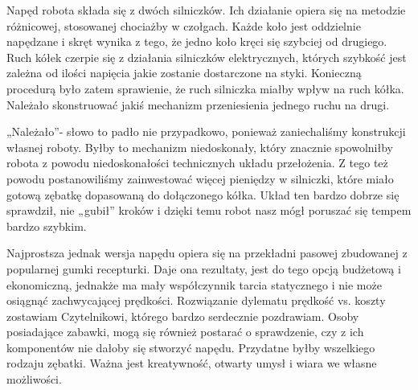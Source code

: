 Napęd robota składa się z dwóch silniczków. Ich działanie opiera się na metodzie różnicowej, stosowanej chociażby w czołgach. Każde koło jest oddzielnie napędzane i skręt wynika z tego, że jedno koło kręci się szybciej od drugiego. Ruch kółek czerpie się z działania silniczków elektrycznych, których szybkość jest zależna od ilości napięcia jakie zostanie dostarczone na styki. Konieczną procedurą było zatem sprawienie, że ruch silniczka miałby wpływ na ruch kółka. Należało skonstruować jakiś mechanizm przeniesienia jednego ruchu na drugi. 

„Należało”- słowo to padło nie przypadkowo, ponieważ zaniechaliśmy konstrukcji własnej roboty. Byłby to mechanizm niedoskonały, który znacznie spowolniłby robota z powodu niedoskonałości technicznych układu przełożenia. Z tego też powodu postanowiliśmy zainwestować więcej pieniędzy w silniczki, które miało gotową zębatkę dopasowaną do dołączonego kółka. Układ ten bardzo dobrze się sprawdził, nie „gubił” kroków i dzięki temu robot nasz mógł poruszać się tempem bardzo szybkim.

Najprostsza jednak wersja napędu opiera się na przekładni pasowej zbudowanej z popularnej gumki recepturki. Daje ona rezultaty, jest do tego opcją budżetową i ekonomiczną, jednakże ma mały współczynnik tarcia statycznego i nie może osiągnąć zachwycającej prędkości. Rozwiązanie dylematu prędkość vs. koszty zostawiam Czytelnikowi, którego bardzo serdecznie pozdrawiam. Osoby posiadające zabawki, mogą się również postarać o sprawdzenie, czy z ich komponentów nie dałoby się stworzyć napędu. Przydatne byłby wszelkiego rodzaju zębatki. Ważna jest kreatywność, otwarty umysł i wiara we własne możliwości. 
